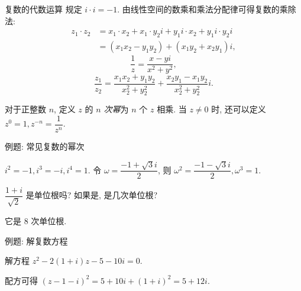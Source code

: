 \begin{frame}{复数的代数运算}
\onslide<+->\alert{规定 $i\cdot i=-1$.}
\onslide<+->由线性空间的数乘和乘法分配律可得复数的乘除法:
\onslide<+->
\begin{align*}
z_1\cdot z_2&=x_1\cdot x_2+x_1\cdot y_2i+y_1i\cdot x_2+y_1i\cdot y_2i\\
&=(x_1x_2-y_1y_2)+(x_1y_2+x_2y_1)i,
\end{align*}
\onslide<+->\[\frac1{z}=\frac{x-yi}{x^2+y^2},\]
\onslide<+->\[\frac{z_1}{z_2}=\frac{x_1x_2+y_1y_2}{x_2^2+y_2^2}+\frac{x_2y_1-x_1y_2}{x_2^2+y_2^2}i.\]

\onslide<+->对于正整数 $n$, 定义 $z$ 的 \emph{$n$ 次幂}为 $n$ 个 $z$ 相乘.
\onslide<+->当 $z\neq 0$ 时, 还可以定义 $z^0=1,z^{-n}=\dfrac1{z^n}$.
\end{frame}


\begin{frame}{例题: 常见复数的幂次}
\beqskip{4pt}
\onslide<+->
\begin{example}
 $i^2=-1,i^3=-i,i^4=1$.
%
 令 $\omega=\dfrac{-1+\sqrt 3i}2$, 则 $\omega^2=\dfrac{-1-\sqrt3i}2,\omega^3=1$.
\end{example}
\onslide<+->
\begin{think}
$\dfrac{1+i}{\sqrt2}$ 是单位根吗? 如果是, 是几次单位根?
\end{think}
\onslide<+->
\begin{answer}
它是 $8$ 次单位根.
\end{answer}
\endgroup
\end{frame}


\begin{frame}{例题: 解复数方程}
\onslide<+->
\begin{example}
解方程 $z^2-2(1+i)z-5-10i=0$.
\end{example}
\onslide<+->
\begin{solution}
\indent 配方可得 $(z-1-i)^2=5+10i+(1+i)^2=5+12i$.

\vspace{-\baselineskip}
\visible<+->{\[x^2-\left(\frac 6x\right)^2=5,\quad
	x^4-5x^2-36=0,\quad x^2=9,\]}
\visible<+->{\[z=1+i\pm(3+2i)=4+3i\ \text{或}\ -2-i.\]}
\vspace{-\baselineskip}
\end{solution}
\end{frame}


